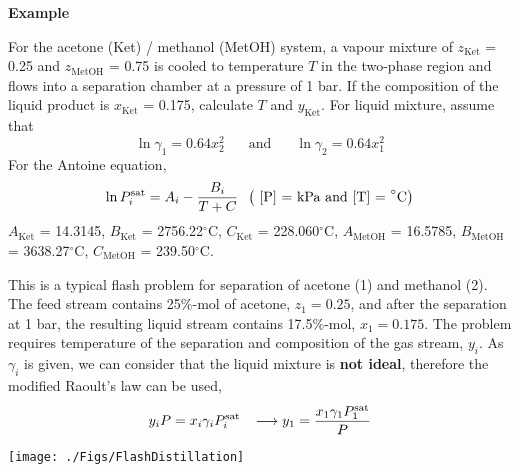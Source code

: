    \begin{MyExample}{\begin{center}{\bf Example}\end{center}}
     \begin{example}\label{Chapter:SolutionThermodynamics:Example2}\citep{SmithVanNess_Book}
          For the acetone (Ket) / methanol (MetOH) system, a vapour mixture of $z_{\text{Ket}}$ = 0.25 and $z_{\text{MetOH}}$ = 0.75 is cooled to temperature $T$ in the two-phase region and flows into a separation chamber at a pressure of 1 bar. If the composition of the liquid product is $x_{\text{Ket}}$ = 0.175, calculate $T$  and $y_{\text{Ket}}$. For liquid mixture, assume that
\begin{displaymath}
\ln\gamma_{1} = 0.64x_{2}^{2} \;\;\;\;\;\text{ and }\;\;\;\;\;\ln\gamma_{2}=0.64x_{1}^{2}
\end{displaymath}
For the Antoine equation, 
\begin{displaymath}
\ln P_{i}^{\text{sat}} = A_{i} - \displaystyle\frac{B_{i}}{T + C} \;\;\left(\text{ [P] = kPa and [T] = }^{\circ}\text{C}\right)
\end{displaymath}
$A_{\text{Ket}}$ = 14.3145, $B_{\text{Ket}}$ = 2756.22$^{\circ}$C, $C_{\text{Ket}}$ = 228.060$^{\circ}$C, $A_{\text{MetOH}}$ = 16.5785, $B_{\text{MetOH}}$ = 3638.27$^{\circ}$C, $C_{\text{MetOH}}$ = 239.50$^{\circ}$C.
     \end{example}

            This is a typical flash problem for separation of acetone (1) and methanol (2). The feed stream contains 25$\%$-mol of acetone, \ie $z_{1}=0.25$, and after the separation at 1 bar, the resulting liquid stream contains 17.5$\%$-mol, \ie $x_{1}=0.175$. The problem requires temperature of the separation and composition of the gas stream, $y_{i}$. As $\gamma_{i}$ is given, we can consider that the liquid mixture is {\bf not ideal}, therefore the modified Raoult's law can be used,
\begin{displaymath}
    y_{i}P = x_{i}\gamma_{i}P_{i}^{\text{sat}} \;\;\;\longrightarrow y_{1}=\displaystyle\frac{x_{1}\gamma_{1}P_{1}^{\text{sat}}}{P}
\end{displaymath}
     \begin{center}
         \texttt{[image: ./Figs/FlashDistillation]}
     \end{center}


\end{MyExample}
